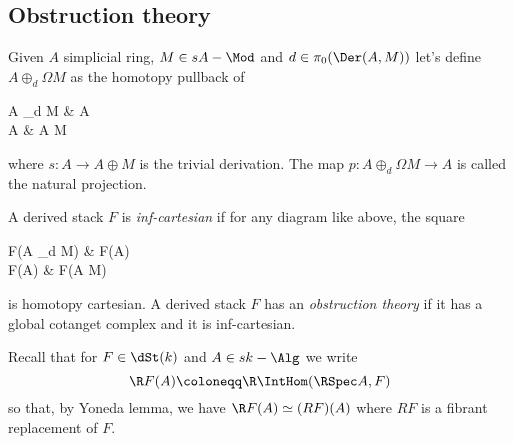         \subsection{Obstruction theory}
            \begin{defn}
                \label{defn:somma_d_omega}
                Given $A$ simplicial ring, $M \in sA-\Mod$ and $d \in \pi_0(\Der(A, M))$ let's define $A \oplus_d \Omega M$ as the homotopy pullback of 
                \begin{diag}
                    A \oplus_d \Omega M \ar[d] \ar[r, "p"] & A \ar[d, "d"] \\
                    A \ar[r, "s"] & A \oplus M
                \end{diag}
                where $s\colon A \to A \oplus M$ is the trivial derivation. The map $p\colon A \oplus_d \Omega M \to A$ is called the natural projection.
            \end{defn}
            \begin{defn}
                \label{defn:obstruction_theory}
                A derived stack $F$ is \emph{inf-cartesian} if for any diagram like above, the square 
                \begin{diag}
                    \R F(A \oplus_d \Omega M) \ar[r] \ar[d] & \R F(A) \ar[d] \\
                    \R F(A) \ar[r, "r"] & \R F(A \oplus M)
                \end{diag}
                is homotopy cartesian.
                A derived stack $F$ has an \emph{obstruction theory} if it has a global cotanget complex and it is inf-cartesian.
            \end{defn}
            Recall that for $F \in \dSt(k)$ and $A \in sk-\Alg$ we write \[\R F(A) \coloneqq \R\IntHom(\RSpec A, F) \] so that, by Yoneda lemma, we have $\R F(A) \simeq (RF)(A)$ where $RF$ is a fibrant replacement of $F$.